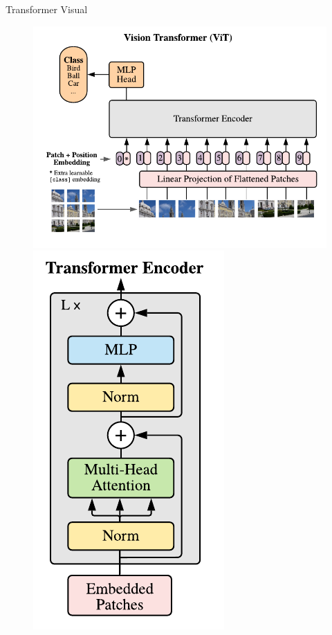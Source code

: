 \documentclass{beamer}
\begin{document}
\begin{frame}{Transformer Visual}

    \begin{figure}[!ht]
        \centering
        \includegraphics[width=0.7\columnwidth]{
            Imagens/vit.png
        }
        \includegraphics[width=0.2\columnwidth]{
            Imagens/encoder.png
        }
        \caption{\cite{dosovitskiy2020image}}
        \label{fig:vit}
    \end{figure}
\end{frame}
\end{document}

